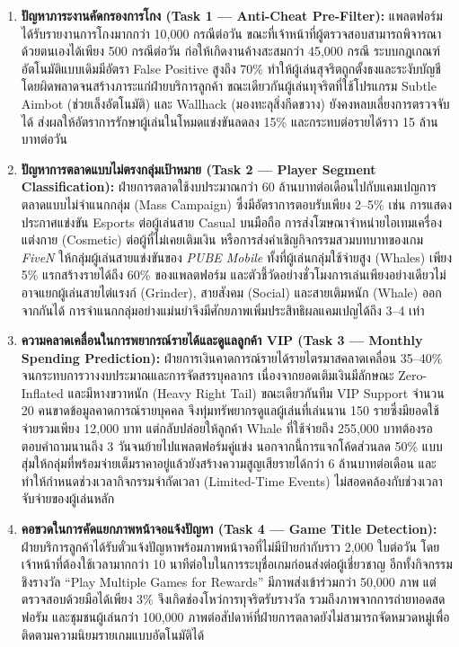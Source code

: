 \documentclass[11pt,a4paper]{article}
\begin{document}
\begin{enumerate}[leftmargin=1.9em,itemsep=2.5pt]
    \item \textbf{ปัญหาภาระงานคัดกรองการโกง (Task 1 — Anti-Cheat Pre-Filter):} แพลตฟอร์มได้รับรายงานการโกงมากกว่า 10,000 กรณีต่อวัน ขณะที่เจ้าหน้าที่ผู้ตรวจสอบสามารถพิจารณาด้วยตนเองได้เพียง 500 กรณีต่อวัน ก่อให้เกิดงานค้างสะสมกว่า 45,000 กรณี ระบบกฎเกณฑ์อัตโนมัติแบบเดิมมีอัตรา False Positive สูงถึง 70\% ทำให้ผู้เล่นสุจริตถูกตั้งธงและระงับบัญชีโดยผิดพลาดจนสร้างภาระแก่ฝ่ายบริการลูกค้า ขณะเดียวกันผู้เล่นทุจริตที่ใช้โปรแกรม Subtle Aimbot (ช่วยเล็งอัตโนมัติ) และ Wallhack (มองทะลุสิ่งกีดขวาง) ยังคงหลบเลี่ยงการตรวจจับได้ ส่งผลให้อัตราการรักษาผู้เล่นในโหมดแข่งขันลดลง 15\% และกระทบต่อรายได้ราว 15 ล้านบาทต่อวัน
    \item \textbf{ปัญหาการตลาดแบบไม่ตรงกลุ่มเป้าหมาย (Task 2 — Player Segment Classification):} ฝ่ายการตลาดใช้งบประมาณกว่า 60 ล้านบาทต่อเดือนไปกับแคมเปญการตลาดแบบไม่จำแนกกลุ่ม (Mass Campaign) ซึ่งมีอัตราการตอบรับเพียง 2--5\% เช่น การแสดงประกาศแข่งขัน Esports ต่อผู้เล่นสาย Casual บนมือถือ การส่งโฆษณาจำหน่ายไอเทมเครื่องแต่งกาย (Cosmetic) ต่อผู้ที่ไม่เคยเติมเงิน หรือการส่งคำเชิญกิจกรรมสวมบทบาทของเกม \textit{FiveN} ให้กลุ่มผู้เล่นสายแข่งขันของ \textit{PUBE Mobile} ทั้งที่ผู้เล่นกลุ่มใช้จ่ายสูง (Whales) เพียง 5\% แรกสร้างรายได้ถึง 60\% ของแพลตฟอร์ม และตัวชี้วัดอย่างชั่วโมงการเล่นเพียงอย่างเดียวไม่อาจแยกผู้เล่นสายไต่แรงก์ (Grinder), สายสังคม (Social) และสายเติมหนัก (Whale) ออกจากกันได้ การจำแนกกลุ่มอย่างแม่นยำจึงมีศักยภาพเพิ่มประสิทธิผลแคมเปญได้ถึง 3--4 เท่า
    \item \textbf{ความคลาดเคลื่อนในการพยากรณ์รายได้และดูแลลูกค้า VIP (Task 3 — Monthly Spending Prediction):} ฝ่ายการเงินคาดการณ์รายได้รายไตรมาสคลาดเคลื่อน 35--40\% จนกระทบการวางงบประมาณและการจัดสรรบุคลากร เนื่องจากยอดเติมเงินมีลักษณะ Zero-Inflated และมีหางขวาหนัก (Heavy Right Tail) ขณะเดียวกันทีม VIP Support จำนวน 20 คนขาดข้อมูลคาดการณ์รายบุคคล จึงทุ่มทรัพยากรดูแลผู้เล่นที่เล่นนาน 150 รายซึ่งมียอดใช้จ่ายรวมเพียง 12,000 บาท แต่กลับปล่อยให้ลูกค้า Whale ที่ใช้จ่ายถึง 255,000 บาทต้องรอตอบคำถามนานถึง 3 วันจนย้ายไปแพลตฟอร์มคู่แข่ง นอกจากนี้การแจกโค้ดส่วนลด 50\% แบบสุ่มให้กลุ่มที่พร้อมจ่ายเต็มราคาอยู่แล้วยังสร้างความสูญเสียรายได้กว่า 6 ล้านบาทต่อเดือน และทำให้กำหนดช่วงเวลากิจกรรมจำกัดเวลา (Limited-Time Events) ไม่สอดคล้องกับช่วงเวลาจับจ่ายของผู้เล่นหลัก
    \item \textbf{คอขวดในการคัดแยกภาพหน้าจอแจ้งปัญหา (Task 4 — Game Title Detection):} ฝ่ายบริการลูกค้าได้รับตั๋วแจ้งปัญหาพร้อมภาพหน้าจอที่ไม่มีป้ายกำกับราว 2,000 ใบต่อวัน โดยเจ้าหน้าที่ต้องใช้เวลามากกว่า 10 นาทีต่อใบในการระบุชื่อเกมก่อนส่งต่อผู้เชี่ยวชาญ อีกทั้งกิจกรรมชิงรางวัล ``Play Multiple Games for Rewards'' มีภาพส่งเข้าร่วมกว่า 50,000 ภาพ แต่ตรวจสอบด้วยมือได้เพียง 3\% จึงเกิดช่องโหว่การทุจริตรับรางวัล รวมถึงภาพจากการถ่ายทอดสด ฟอรัม และชุมชนผู้เล่นกว่า 100,000 ภาพต่อสัปดาห์ที่ฝ่ายการตลาดยังไม่สามารถจัดหมวดหมู่เพื่อติดตามความนิยมรายเกมแบบอัตโนมัติได้

\end{enumerate}
\end{document}

